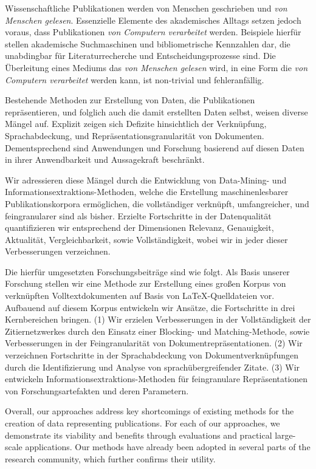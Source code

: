 \Abstract[Zusammenfassung]{}
Wissenschaftliche Publikationen werden von Menschen geschrieben und \emph{von Menschen gelesen}.
Essenzielle Elemente des akademisches Alltags setzen jedoch voraus, dass Publikationen \emph{von Computern verarbeitet} werden.
Beispiele hierfür stellen akademische Suchmaschinen und bibliometrische Kennzahlen dar, die unabdingbar für Literaturrecherche und Entscheidungsprozesse sind.
Die Überleitung eines Mediums das \emph{von Menschen gelesen} wird, in eine Form die \emph{von Computern verarbeitet} werden kann, ist non-trivial und fehleranfällig.

Bestehende Methoden zur Erstellung von Daten, die Publikationen repräsentieren, und folglich auch die damit erstellten Daten selbst, weisen diverse Mängel auf. Explizit zeigen sich Defizite hinsichtlich der Verknüpfung, Sprachabdeckung, und Repräsentationsgranularität von Dokumenten. Dementsprechend sind Anwendungen und Forschung basierend auf diesen Daten in ihrer Anwendbarkeit und Aussagekraft beschränkt.

Wir adressieren diese Mängel durch die Entwicklung von Data-Mining- und In\-for\-ma\-tions\-ex\-trak\-tions-Methoden, welche die Erstellung maschinenlesbarer Publikationskorpora ermöglichen, die vollständiger verknüpft, umfangreicher, und feingranularer sind als bisher. Erzielte Fortschritte in der Datenqualität quantifizieren wir entsprechend der Dimensionen Relevanz, Genauigkeit, Aktualität, Vergleichbarkeit, sowie Vollständigkeit, wobei wir in jeder dieser Verbesserungen verzeichnen.

Die hierfür umgesetzten Forschungsbeiträge sind wie folgt.
Als Basis unserer Forschung stellen wir eine Methode zur Erstellung eines großen Korpus von verknüpften Volltextdokumenten auf Basis von \LaTeX-Quelldateien vor.
Aufbauend auf diesem Korpus entwickeln wir Ansätze, die Fortschritte in drei Kernbereichen bringen.
(1) Wir erzielen Verbesserungen in der Vollständigkeit der Zitiernetzwerkes durch den Einsatz einer Blocking- und Matching-Methode, sowie Verbesserungen in der Feingranularität von Dokumentrepräsentationen.
(2) Wir verzeichnen Fortschritte in der Sprachabdeckung von Dokumentverknüpfungen durch die Identifizierung und Analyse von sprachübergreifender Zitate.
(3) Wir entwickeln In\-for\-ma\-tions\-ex\-trak\-tions-Methoden für feingranulare Repräsentationen von Forschungsartefakten und deren Parametern.

Overall, our approaches address key shortcomings of existing methods for the creation of data representing publications.
For each of our approaches, we demonstrate its viability and benefits through evaluations and practical large-scale applications.
Our methods have already been adopted in several parts of the research community, which further confirms their utility.
